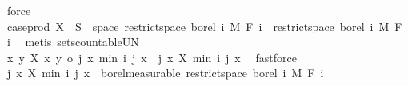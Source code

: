 \begin{isabellebody}
\ force\ \ \isanewline
\ \ \ \ \isamarkupfalse%
\ \isamarkupfalse%
\ {\isachardoublequoteopen}case{\isacharunderscore}{\kern0pt}prod\ X\ {\isacharminus}{\kern0pt}{\isacharbackquote}{\kern0pt}\ S\ {\isasyminter}\ space\ {\isacharparenleft}{\kern0pt}restrict{\isacharunderscore}{\kern0pt}space\ borel\ {\isacharbraceleft}{\kern0pt}{}{\isachardot}{\kern0pt}{\isachardot}{\kern0pt}i{\isacharbraceright}{\kern0pt}\ {\isasymOtimes}\isactrlsub M\ F\ i{\isacharparenright}{\kern0pt}\ {\isasymin}\ restrict{\isacharunderscore}{\kern0pt}space\ borel\ {\isacharbraceleft}{\kern0pt}{}{\isachardot}{\kern0pt}{\isachardot}{\kern0pt}i{\isacharbraceright}{\kern0pt}\ {\isasymOtimes}\isactrlsub M\ F\ i{\isachardoublequoteclose}\ \isamarkupfalse%
\ {\isacharparenleft}{\kern0pt}metis\ sets{\isachardot}{\kern0pt}countable{\isacharunderscore}{\kern0pt}UN{\isacharparenright}{\kern0pt}\isanewline
\ \ \isamarkupfalse%
\isanewline
\ \ \isamarkupfalse%
\ \isamarkupfalse%
\ {\isachardoublequoteopen}{\isacharparenleft}{\kern0pt}{\isasymlambda}{\isacharparenleft}{\kern0pt}x{\isacharcomma}{\kern0pt}\ y{\isacharparenright}{\kern0pt}{\isachardot}{\kern0pt}\ X\ x\ y{\isacharparenright}{\kern0pt}\ o\ {\isacharparenleft}{\kern0pt}{\isasymlambda}{\isacharparenleft}{\kern0pt}j{\isacharcomma}{\kern0pt}\ x{\isacharparenright}{\kern0pt}{\isachardot}{\kern0pt}\ {\isacharparenleft}{\kern0pt}min\ i\ j{\isacharcomma}{\kern0pt}\ x{\isacharparenright}{\kern0pt}{\isacharparenright}{\kern0pt}\ {\isacharequal}{\kern0pt}\ {\isacharparenleft}{\kern0pt}{\isasymlambda}{\isacharparenleft}{\kern0pt}j{\isacharcomma}{\kern0pt}\ x{\isacharparenright}{\kern0pt}{\isachardot}{\kern0pt}\ X\ {\isacharparenleft}{\kern0pt}min\ i\ j{\isacharparenright}{\kern0pt}\ x{\isacharparenright}{\kern0pt}{\isachardoublequoteclose}\ \isamarkupfalse%
\ fastforce\isanewline
\ \ \isamarkupfalse%
\ \isamarkupfalse%
\ {\isachardoublequoteopen}{\isacharparenleft}{\kern0pt}{\isasymlambda}{\isacharparenleft}{\kern0pt}j{\isacharcomma}{\kern0pt}\ x{\isacharparenright}{\kern0pt}{\isachardot}{\kern0pt}\ X\ {\isacharparenleft}{\kern0pt}min\ i\ j{\isacharparenright}{\kern0pt}\ x{\isacharparenright}{\kern0pt}\ {\isasymin}\ borel{\isacharunderscore}{\kern0pt}measurable\ {\isacharparenleft}{\kern0pt}restrict{\isacharunderscore}{\kern0pt}space\ borel\ {\isacharbraceleft}{\kern0pt}{}{\isachardot}{\kern0pt}{\isachardot}{\kern0pt}i{\isacharbraceright}{\kern0pt}\ {\isasymOtimes}\isactrlsub M\ F\ i{\isacharparenright}{\kern0pt}{\isachardoublequoteclose}\ \isamarkupfalse%

\end{isabellebody}
